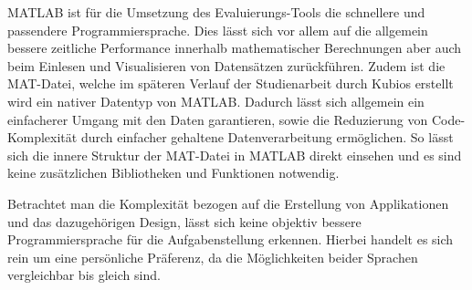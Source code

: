 MATLAB ist für die Umsetzung des Evaluierungs-Tools die schnellere und passendere Programmiersprache. Dies lässt sich vor allem auf die allgemein bessere zeitliche Performance innerhalb mathematischer Berechnungen aber auch beim Einlesen und Visualisieren von Datensätzen zurückführen. Zudem ist die MAT-Datei, welche im späteren Verlauf der Studienarbeit durch Kubios erstellt wird ein nativer Datentyp von MATLAB. Dadurch lässt sich allgemein ein einfacherer Umgang mit den Daten garantieren, sowie die Reduzierung von Code-Komplexität durch einfacher gehaltene Datenverarbeitung ermöglichen. So lässt sich die innere Struktur der MAT-Datei in MATLAB direkt einsehen und es sind keine zusätzlichen Bibliotheken und Funktionen notwendig.

Betrachtet man die Komplexität bezogen auf die Erstellung von Applikationen und das dazugehörigen Design, lässt sich keine objektiv bessere Programmiersprache für die Aufgabenstellung erkennen. Hierbei handelt es sich rein um eine persönliche Präferenz, da die Möglichkeiten beider Sprachen vergleichbar bis gleich sind.